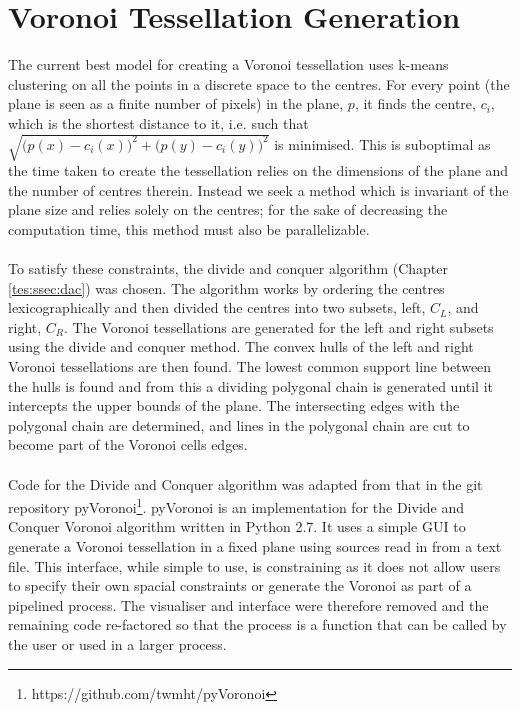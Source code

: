 \section{Voronoi Tessellation Generation}
The current best model for creating a Voronoi tessellation uses k-means clustering on all the points in a discrete space to the centres. For every point (the plane is seen as a finite number of pixels) in the plane, $p$, it finds the centre, $c_i$, which is the shortest distance to it, i.e. such that $\sqrt{\big(p(x)-c_i(x)\big)^2 + \big(p(y)-c_i(y)\big)^2}$ is minimised. This is suboptimal as the time taken to create the tessellation relies on the dimensions of the plane and the number of centres therein. Instead we seek a method which is invariant of the plane size and relies solely on the centres; for the sake of decreasing the computation time, this method must also be parallelizable. 
\\
\\
To satisfy these constraints, the divide and conquer algorithm (Chapter \ref{tes:ssec:dac}) was chosen. The algorithm works by ordering the centres lexicographically and then divided the centres into two subsets, left, $C_L$, and right, $C_R$. The Voronoi tessellations are generated for the left and right subsets using the divide and conquer method. The convex hulls of the left and right Voronoi tessellations are then found. The lowest common support line between the hulls is found and from this a dividing polygonal chain is generated until it intercepts the upper bounds of the plane. The intersecting edges with the polygonal chain are determined, and lines in the polygonal chain are cut to become part of the Voronoi cells edges.
\\
\\
Code for the Divide and Conquer algorithm was adapted from that in the git repository pyVoronoi\footnote{https://github.com/twmht/pyVoronoi}. pyVoronoi is an implementation for the Divide and Conquer Voronoi algorithm written in Python 2.7. It uses a simple GUI to generate a Voronoi tessellation in a fixed plane using sources read in from a text file. This interface, while simple to use, is constraining as it does not allow users to specify their own spacial constraints or generate the Voronoi as part of a pipelined process. The visualiser and interface were therefore removed and the remaining code re-factored so that the process is a function that can be called by the user or used in a larger process.

